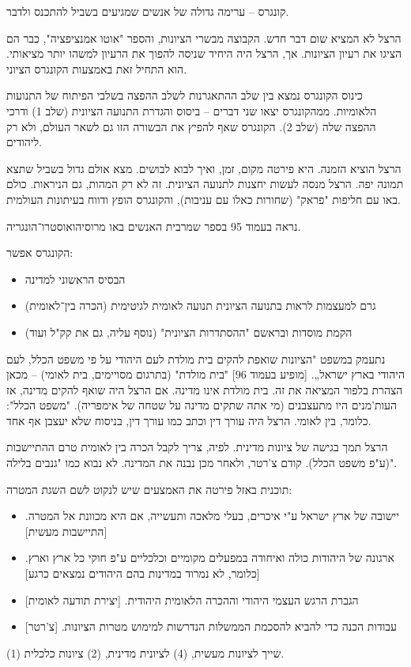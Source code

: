 \documentclass[a4paper]{book}
\begin{document}
	קונגרס – ערימה גדולה של אנשים שמגיעים בשביל להתכנס ולדבר. 
	
	הרצל לא המציא שום דבר חדש. הקבוצה מבשרי הציונות, והספר "אוטו אמנציפציה", כבר הם הציגו את רעיון הציונות. אך, הרצל היה היחיד שניסה להפוך את הרעיון למשהו יותר מציאותי. הוא התחיל זאת באמצעות הקונגרס הציוני. 
	
	כינוס הקונגרס נמצא בין שלב ההתאגרנות לשלב ההפצה בשלבי הפיתוח של התנועות הלאומיות. ממהקונגרס יצאו שני דברים – ביסוס והגדרת התנועה הציונית (שלב 1) ודרכי ההפצה שלה (שלב 2). הקונגרס שאף להפיץ את הבשורה הזו גם לשאר העולם, ולא רק ליהודים. 
	
	הרצל הוציא הזמנה. היא פירטה מקום, זמן, ואיך לבוא לבושים. מצא אולם גדול בשביל שתצא תמונה יפה. הרצל מנסה לעשות יחצנות לתנועה הציונית. זה לא רק המהות, גם הניראות. כולם באו עם חליפות "פראק" (שחורות כאלו עם עניבות), והקונגרס הופץ ודווח בעיתונות העולמית. 
	
	נראה בעמוד 95 בספר שמרבית האנשים באו מרוסיהואוסטרו־הונגריה. 
	
	הקונגרס אפשר: 
	\begin{itemize}
		\item הבסיס הראשוני למדינה
		\item גרם למעצמות לראות בתנועה הציונית תנועה לאומית לגיטימית (הכרה בין־לאומית)
		\item הקמת מוסדות ובראשם "ההסתדרות הציונית" (נוסף עליה, גם את קק"ל ועוד)
	\end{itemize}
	
	נתעמק במשפט "הציונות שואפת להקים בית מולדת לעם היהודי על פי משפט הכלל, לעם היהודי בארץ ישראל„. [מופיע בעמוד 96] "בית מולדת" (בתרגום מסויימים, בית לאומי) – מכאן הצהרת בלפור המציאה את זה. בית מולדת אינו מדינה. אם הרצל היה שואף להקים מדינה, אז העות'מנים היו מתעצבנים (מי אתה שתקים מדינה על שטחה של אימפריה). "משפט הכלל": כלומר, בין לאומי. הרצל היה עורך דין וכתב כמו עורך דין, בניסוח שלא יעצבן אף אחד. 
	
	הרצל תמך בגישה של ציונות מדינית. לפיה, צריך לקבל הכרה בין לאומית טרם ההתיישבות (ע"פ משפט הכלל). קודם צ'רטר, ולאחר מכן נבנה את המדינה. לא נבוא כמו "גנבים בלילה". 
	
	תוכנית באזל פירטה את האמצעים שיש לנקוט לשם השגת המטרה: 
	\begin{itemize}
		\item יישובה של ארץ ישראל ע"י איכרים, בעלי מלאכה ותעשייה, אם היא מכוונת אל המטרה. [התיישבות מעשית]
		\item ארגונה של היהודות כולה ואיחודה במפעלים מקומיים וכלכליים ע"פ חוקי כל ארץ וארץ. [כלומר, לא נמרוד במדינות בהם היהודים נמצאים כרגע]
		\item הגברת הרגש העצמי היהודי וההכרה הלאומית היהודית. [יצירת תודעה לאומית]
		\item עבודות הכנה כדי להביא להסכמת הממשלות הנדרשות למימוש מטרות הציונות. [צ'רטר]
	\end{itemize}
	(1) שייך לציונות מעשית, (4) לציונית מדינית, (2) ציונות כלכלית. 
	
\end{document}
